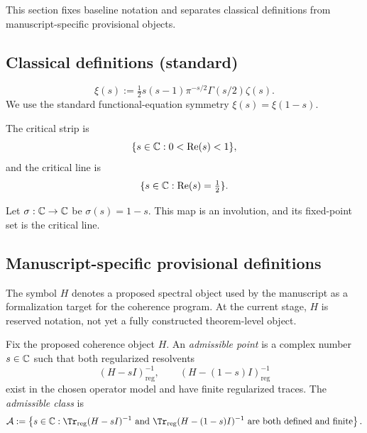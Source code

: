 This section fixes baseline notation and separates classical definitions from manuscript-specific provisional objects.

\subsection*{Classical definitions (standard)}

\begin{definition}
\[
\xi(s) := \tfrac12 s(s-1)\pi^{-s/2}\Gamma(s/2)\zeta(s).
\]
We use the standard functional-equation symmetry $\xi(s)=\xi(1-s)$.
\end{definition}

\begin{definition}
The critical strip is
\[
\{s\in\mathbb{C}:0<\operatorname{Re}(s)<1\},
\]
and the critical line is
\[
\{s\in\mathbb{C}:\operatorname{Re}(s)=\tfrac12\}.
\]
\end{definition}

\begin{definition}
Let $\sigma:\mathbb{C}\to\mathbb{C}$ be $\sigma(s)=1-s$. This map is an involution, and its fixed-point set is the critical line.
\end{definition}

\subsection*{Manuscript-specific provisional definitions}

\begin{definition}
The symbol $H$ denotes a proposed spectral object used by the manuscript as a formalization target for the coherence program.
At the current stage, $H$ is reserved notation, not yet a fully constructed theorem-level object.
\end{definition}

\begin{definition}
Fix the proposed coherence object $H$.
An \emph{admissible point} is a complex number $s\in\mathbb{C}$ such that both regularized resolvents
\[
(H-sI)^{-1}_{\mathrm{reg}},
\qquad
(H-(1-s)I)^{-1}_{\mathrm{reg}}
\]
exist in the chosen operator model and have finite regularized traces.
The \emph{admissible class} is
\[
\mathcal{A}:=\left\{s\in\C:
\Tr_{\mathrm{reg}}(H-sI)^{-1}\ \text{and}\ \Tr_{\mathrm{reg}}(H-(1-s)I)^{-1}\ \text{are both defined and finite}
\right\}.
\]
\end{definition}

